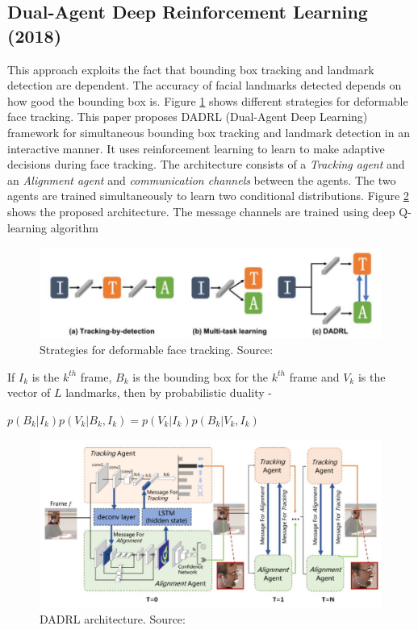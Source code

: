 \documentclass{llncs}
\begin{document}
\subsection{Dual-Agent Deep Reinforcement Learning (2018) \cite{dadrl}}

This approach exploits the fact that bounding box tracking and landmark detection are dependent. The accuracy of facial landmarks detected depends on how good the bounding box is.
Figure \ref{deformable_face_tracking} shows different strategies for deformable face tracking. This paper proposes DADRL (Dual-Agent Deep Learning) framework for simultaneous bounding box tracking and landmark detection in an interactive manner. It uses reinforcement learning to learn to make adaptive decisions during face tracking. The architecture consists of a \textit{Tracking agent} and an \textit{Alignment agent} and \textit{communication channels} between the agents. The two agents are trained simultaneously to learn two conditional distributions. Figure \ref{dadrl_architecture} shows the proposed architecture. The message channels are trained using deep Q-learning algorithm\\

\begin{figure}
\centering
\includegraphics[scale=0.5]{Media/deformable_face_tracking}
\caption{Strategies for deformable face tracking. Source:\cite{dadrl}}
\label{deformable_face_tracking}
\end{figure}

If $I_k$ is the $k^{th}$ frame, $B_k$ is the bounding box for the $k^{th}$ frame and $V_k$ is the vector of $L$ landmarks, then by probabilistic duality -  

$p\left(B_{k} | I_{k}\right) p\left(V_{k} | B_{k}, I_{k}\right)=p\left(V_{k} | I_{k}\right) p\left(B_{k} | V_{k}, I_{k}\right)$\\

\begin{figure}
\centering
\includegraphics[scale=0.5]{Media/DADRL}
\caption{DADRL architecture. Source:\cite{dadrl}}
\label{dadrl_architecture}
\end{figure}
\end{document}
